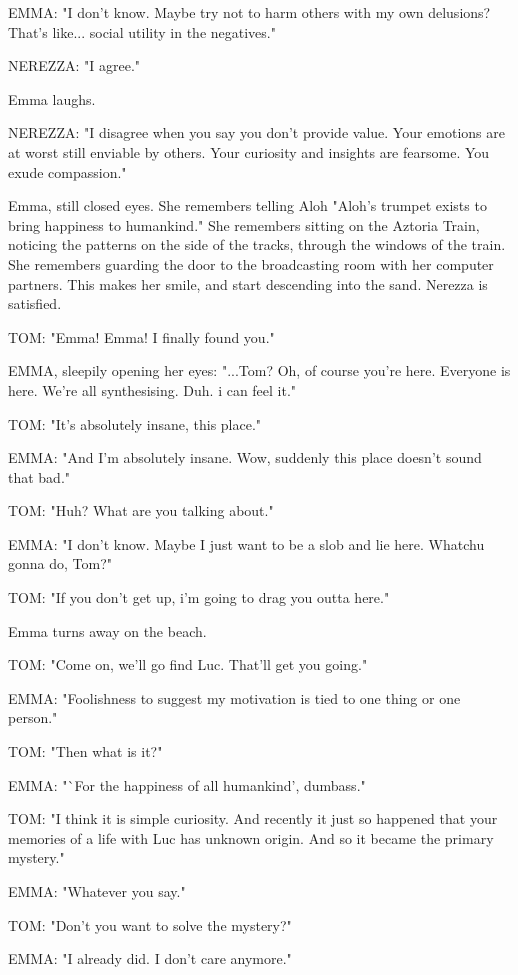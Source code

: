 \documentclass[11pt]{article}
\begin{document}
EMMA: "I don't know. 
Maybe try not to harm others with my own delusions?
That's like... social utility in the negatives."

NEREZZA: "I agree."

Emma laughs.

NEREZZA: "I disagree when you say you don't provide value.
Your emotions are at worst still enviable by others.
Your curiosity and insights are fearsome.
You exude compassion."

Emma, still closed eyes.
She remembers telling Aloh "Aloh's trumpet exists to bring happiness to humankind."
She remembers sitting on the Aztoria Train, noticing the patterns on the side of the tracks, through the windows of the train.
She remembers guarding the door to the broadcasting room with her computer partners.
This makes her smile, and start descending into the sand.
Nerezza is satisfied.

TOM: "Emma! Emma! I finally found you."

EMMA, sleepily opening her eyes: "...Tom? 
Oh, of course you're here. 
Everyone is here.
We're all synthesising. Duh.
i can feel it."

TOM: "It's absolutely insane, this place."

EMMA: "And I'm absolutely insane. Wow, suddenly this place doesn't sound that bad."

TOM: "Huh? What are you talking about."

EMMA: "I don't know.
Maybe I just want to be a slob and lie here.
Whatchu gonna do, Tom?"

TOM: "If you don't get up, i'm going to drag you outta here."

Emma turns away on the beach.

TOM: "Come on, we'll go find Luc.
That'll get you going."

EMMA: "Foolishness to suggest my motivation is tied to one thing or one person."

TOM: "Then what is it?"

EMMA: "`For the happiness of all humankind', dumbass."

TOM: "I think it is simple curiosity.
And recently it just so happened that your memories of a life with Luc has unknown origin.
And so it became the primary mystery."

EMMA: "Whatever you say."

TOM: "Don't you want to solve the mystery?"

EMMA: "I already did. I don't care anymore."
\end{document}
